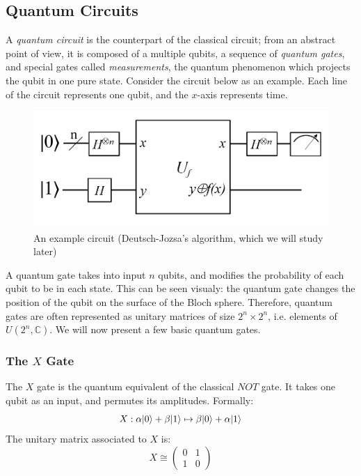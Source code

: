 \documentclass[12pt,a4paper]{article}
\theoremstyle{plain}
\theoremstyle{definition}
\DeclarePairedDelimiter\ket{\lvert}{\rangle}
\begin{document}
\subsection{Quantum Circuits}
A \emph{quantum circuit} is the counterpart of the classical circuit; from an abstract point of view, it is composed of a multiple qubits, a sequence of \emph{quantum gates}, and special gates called \emph{measurements}, the quantum phenomenon which projects the qubit in one pure state. Consider the circuit below as an example. Each line of the circuit represents one qubit, and the $x$-axis represents time.

\begin{figure}[!h]
    \centering
    \includegraphics*[scale=0.35]{deutsch-circuit-n.png}
    \caption{An example circuit (Deutsch-Jozsa's algorithm, which we will study later)}
\end{figure}

A quantum gate takes into input $n$ qubits, and modifies the probability of each qubit to be in each state. This can be seen visualy: the quantum gate changes the position of the qubit on the surface of the Bloch sphere. Therefore, quantum gates are often represented as unitary matrices of size $2^n \times 2^n$, i.e. elements of $U(2^n, \mathbb{C})$. We will now present a few basic quantum gates.

\subsubsection{The \texorpdfstring{$X$}{X} Gate}
The $X$ gate is the quantum equivalent of the classical $NOT$ gate. It takes one qubit as an input, and permutes its amplitudes. Formally:
\begin{equation*}
    X : \alpha\ket{0} + \beta\ket{1} \mapsto \beta\ket{0} + \alpha\ket{1}
\end{equation*}
The unitary matrix associated to $X$ is:
\begin{equation*}
    X \cong \begin{pmatrix}
        0&1\\
        1&0
    \end{pmatrix}
\end{equation*}
\end{document}
